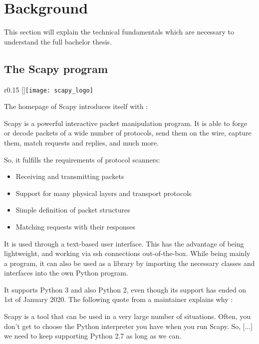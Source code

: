 \section{Background}

This section will explain the technical fundamentals which are necessary to understand the full bachelor thesis.

\subsection{The Scapy program}
\label{sec:scapy}

\begin{wrapfigure}{r}{0.15\textwidth}
    \raisebox{0pt}[\dimexpr{}\baselineskip\relax]{\texttt{[image: scapy\_logo]}}
\end{wrapfigure}

The homepage of Scapy introduces itself with \cite{scapy}:
\begin{displayquote}
Scapy is a powerful interactive packet manipulation program. It is able to forge or decode packets of a wide number of protocols, send them on the wire, capture them, match requests and replies, and much more.
\end{displayquote}

So, it fulfills the requirements of protocol scanners:
\begin{itemize}
    \item Receiving and transmitting packets
    \item Support for many physical layers and transport protocols
    \item Simple definition of packet structures
    \item Matching requests with their responses
\end{itemize} 

It is used through a text-based user interface. This has the advantage of being lightweight, and working via ssh connections out-of-the-box. While being mainly a program, it can also be used as a library by importing the necessary classes and interfaces into the own Python program.

It supports Python 3 and also Python 2, even though its support has ended on 1st of January 2020. The following quote from a maintainer explains why \cite{scapy-py2}:

\begin{displayquote}
    Scapy is a tool that can be used in a very large number of situations. Often, you don't get to choose the Python interpreter you have when you run Scapy. So, [...] we need to keep supporting Python 2.7 as long as we can.
\end{displayquote}


